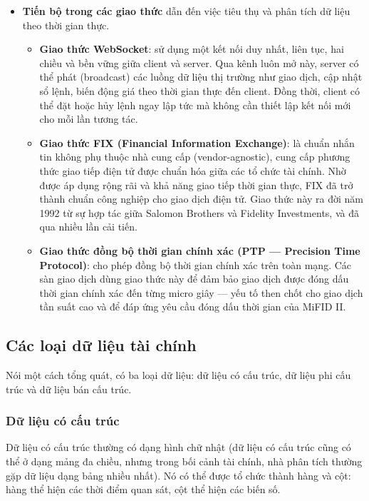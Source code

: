 \begin{itemize}
  \item \textbf{Tiến bộ trong các giao thức} dẫn đến việc tiêu thụ và phân tích dữ liệu theo thời gian thực.
  \begin{itemize}
    \item \textbf{Giao thức WebSocket}: sử dụng một kết nối duy nhất, liên tục, hai chiều và bền vững giữa client và server. Qua kênh luôn mở này, server có thể phát (broadcast) các luồng dữ liệu thị trường như giao dịch, cập nhật sổ lệnh, biến động giá theo thời gian thực đến client. Đồng thời, client có thể đặt hoặc hủy lệnh ngay lập tức mà không cần thiết lập kết nối mới cho mỗi lần tương tác.
    \item \textbf{Giao thức FIX (Financial Information Exchange)}: là chuẩn nhắn tin không phụ thuộc nhà cung cấp (vendor-agnostic), cung cấp phương thức giao tiếp điện tử được chuẩn hóa giữa các tổ chức tài chính. Nhờ được áp dụng rộng rãi và khả năng giao tiếp thời gian thực, FIX đã trở thành chuẩn công nghiệp cho giao dịch điện tử. Giao thức này ra đời năm 1992 từ sự hợp tác giữa Salomon Brothers và Fidelity Investments, và đã qua nhiều lần cải tiến.
    \item \textbf{Giao thức đồng bộ thời gian chính xác (PTP — Precision Time Protocol)}: cho phép đồng bộ thời gian chính xác trên toàn mạng. Các sàn giao dịch dùng giao thức này để đảm bảo giao dịch được đóng dấu thời gian chính xác đến từng micro giây — yếu tố then chốt cho giao dịch tần suất cao và để đáp ứng yêu cầu đóng dấu thời gian của MiFID II.
  \end{itemize}
\end{itemize}

\subsection{Các loại dữ liệu tài chính}

Nói một cách tổng quát, có ba loại dữ liệu: dữ liệu có cấu trúc, dữ liệu phi cấu trúc và dữ liệu bán cấu trúc.

\subsubsection{Dữ liệu có cấu trúc}

Dữ liệu có cấu trúc thường có dạng hình chữ nhật (dữ liệu có cấu trúc cũng có thể ở dạng mảng đa chiều, nhưng trong bối cảnh tài chính, nhà phân tích thường gặp dữ liệu dạng bảng nhiều nhất). Nó có thể được tổ chức thành hàng và cột: hàng thể hiện các thời điểm quan sát, cột thể hiện các biến số.

